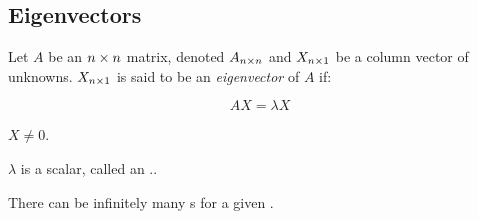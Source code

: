\subsection{Eigenvectors}\label{subsec:Eigenvectors}
\begin{definition}[Eigenvector]\label{def:Eigenvector}
  Let $A$ be an $n \times n$ matrix, denoted $A_{n \times n}$ and $X_{n \times 1}$ be a column vector of unknowns.
  $X_{n \times 1}$ is said to be an \emph{eigenvector} of $A$ if:

  \begin{equation}\label{eq:Eigenvector}
    AX = \lambda X
  \end{equation}

  \begin{propertylist}
  \item $X \neq 0$.\label{prop:Eigenvector_Nonzero}
  \item $\lambda$ is a scalar, called an .\label{prop:Eigenvector_Value}.
  \end{propertylist}

  \begin{remark}
    There can be infinitely many s for a given .
  \end{remark}
\end{definition}

